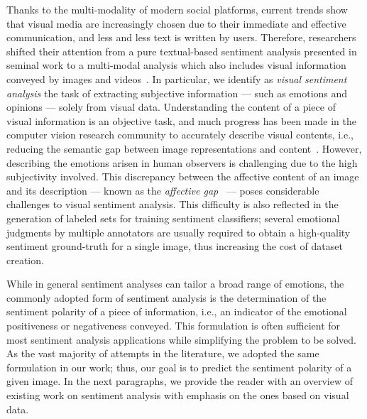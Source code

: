 Thanks to the multi-modality of modern social platforms, current trends show that visual media are increasingly chosen due to their immediate and effective communication, and less and less text is written by users.
Therefore, researchers shifted their attention from a pure textual-based sentiment analysis presented in seminal work to a multi-modal analysis which also includes visual information conveyed by images and videos~\cite{borth2013large,cao2016cross,jou2015visual,siersdorfer2010analyzing,you2015robust,you2016cross}.
In particular, we identify as \emph{visual sentiment analysis} the task of extracting subjective information --- such as emotions and opinions --- solely from visual data.
Understanding the content of a piece of visual information is an objective task, and much progress has been made in the computer vision research community to accurately describe visual contents, i.e., reducing the semantic gap between image representations and content~\cite{li2016socializing}.
However, describing the emotions arisen in human observers is challenging due to the high subjectivity involved.
This discrepancy between the affective content of an image and its description --- known as the \emph{affective gap}~\cite{siersdorfer2010analyzing} --- poses considerable challenges to visual sentiment analysis.
This difficulty is also reflected in the generation of labeled sets for training sentiment classifiers;
several emotional judgments by multiple annotators are usually required to obtain a high-quality sentiment ground-truth for a single image, thus increasing the cost of dataset creation.

While in general sentiment analyses can tailor a broad range of emotions, the commonly adopted form of sentiment analysis is the determination of the sentiment polarity of a piece of information, i.e., an indicator of the emotional positiveness or negativeness conveyed.
This formulation is often sufficient for most sentiment analysis applications while simplifying the problem to be solved.
As the vast majority of attempts in the literature, we adopted the same formulation in our work;
thus, our goal is to predict the sentiment polarity of a given image.
In the next paragraphs, we provide the reader with an overview of existing work on sentiment analysis with emphasis on the ones based on visual data.

